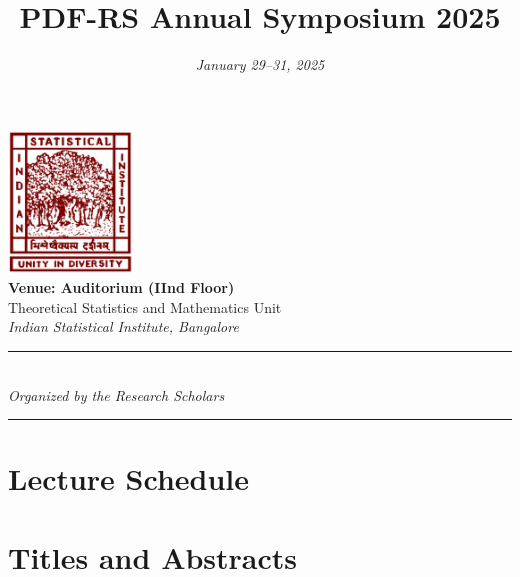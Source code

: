 \documentclass[a4paper,12pt]{article}
\title{\Huge\textbf{PDF-RS Annual Symposium 2025}}
\author{} %
\date{\vspace{-1cm}\Large\textit{January 29--31, 2025}}
\begin{document}
	
	\maketitle
	\thispagestyle{empty} %
	
	\begin{center}
		\vspace{1.5cm}
		\includegraphics[width=0.25\textwidth]{images/isi_logo.png} \\[1.5cm]
		
		{\Huge\textbf{Venue: Auditorium (IInd Floor)}} \\[0.4cm]
		{\Large Theoretical Statistics and Mathematics Unit} \\[0.3cm]
		{\large \textit{Indian Statistical Institute, Bangalore}} \\[2cm]
		
		\rule{\textwidth}{0.5pt} \\[0.6cm]
		{\Large\textit{Organized by the Research Scholars}} \\[0.6cm]
		\rule{\textwidth}{0.5pt}
	\end{center}
	
	\newpage
	
	\section*{Lecture Schedule}
	
	\newpage
	
	\section*{Titles and Abstracts}

	
	
\end{document}
